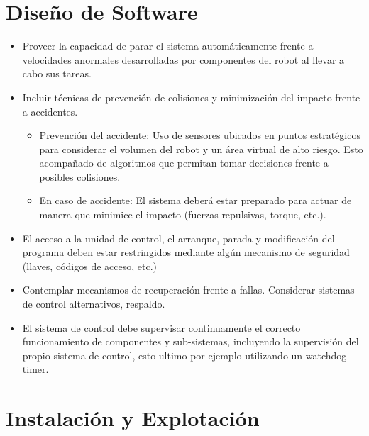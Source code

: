 \documentclass[withindex,glossary]{cam-thesis}
\begin{document}
\section{Diseño de Software} \label{sec: Guía Seguridad :: Diseño de Software}
\begin{itemize}
  \item Proveer la capacidad de parar el sistema automáticamente frente a velocidades anormales desarrolladas por componentes del robot al llevar a cabo sus tareas.
  \item Incluir técnicas de prevención de colisiones y minimización del impacto frente a accidentes.
    \begin{itemize}
        \item Prevención del accidente: Uso de sensores ubicados en puntos estratégicos para considerar el volumen del robot y un área virtual de alto riesgo. Esto acompañado de algoritmos que permitan tomar decisiones frente a posibles colisiones.
        \item En caso de accidente: El sistema deberá estar preparado para actuar de manera que minimice el impacto (fuerzas repulsivas, torque, etc.).
    \end{itemize}
  \item El acceso a la unidad de control, el arranque, parada y modificación del programa deben estar restringidos mediante algún mecanismo de seguridad (llaves, códigos de acceso, etc.)
  \item Contemplar mecanismos de recuperación frente a fallas. Considerar sistemas de control alternativos, respaldo.
  \item El sistema de control debe supervisar continuamente el correcto funcionamiento de componentes y sub-sistemas, incluyendo la supervisión del propio sistema de control, esto ultimo por ejemplo utilizando un watchdog timer.
\end{itemize}

\section{Instalación y Explotación} \label{sec: Guía Seguridad :: Instalación y Explotación}
\end{document}
